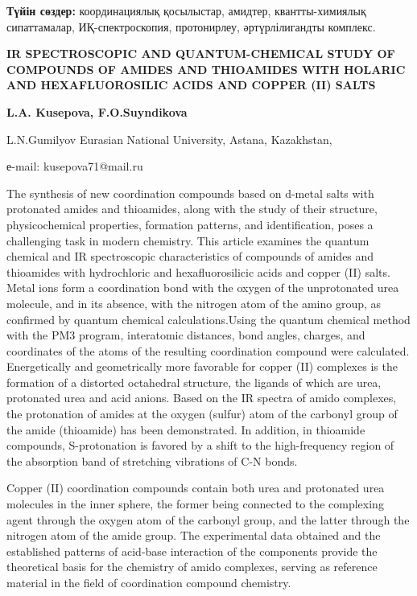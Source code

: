 {\bfseries Түйін сөздер:} координациялық қосылыстар, амидтер,
квантты-химиялық сипаттамалар, ИҚ-спектроскопия, протонирлеу,
әртүрлілигандты комплекс.

\begin{center}
{\large\bfseries IR SPECTROSCOPIC AND QUANTUM-CHEMICAL STUDY OF COMPOUNDS OF AMIDES AND THIOAMIDES WITH HOLARIC AND HEXAFLUOROSILIC ACIDS AND COPPER (II) SALTS}

{\bfseries L.A. Kusepova\envelope, F.O.Suyndikova}

L.N.Gumilyov Eurasian National University, Astana, Kazakhstan,

е-mail: kusepova71@mail.ru
\end{center}

The synthesis of new coordination compounds based on d-metal salts with
protonated amides and thioamides, along with the study of their
structure, physicochemical properties, formation patterns, and
identification, poses a challenging task in modern chemistry. This
article examines the quantum chemical and IR spectroscopic
characteristics of compounds of amides and thioamides with hydrochloric
and hexafluorosilicic acids and copper (II) salts. Metal ions form a
coordination bond with the oxygen of the unprotonated urea molecule, and
in its absence, with the nitrogen atom of the amino group, as confirmed
by quantum chemical calculations.Using the quantum chemical method with
the PM3 program, interatomic distances, bond angles, charges, and
coordinates of the atoms of the resulting coordination compound were
calculated. Energetically and geometrically more favorable for copper
(II) complexes is the formation of a distorted octahedral structure, the
ligands of which are urea, protonated urea and acid anions. Based on the
IR spectra of amido complexes, the protonation of amides at the oxygen
(sulfur) atom of the carbonyl group of the amide (thioamide) has been
demonstrated. In addition, in thioamide compounds, S-protonation is
favored by a shift to the high-frequency region of the absorption band
of stretching vibrations of C-N bonds.

Copper (II) coordination compounds contain both urea and protonated urea
molecules in the inner sphere, the former being connected to the
complexing agent through the oxygen atom of the carbonyl group, and the
latter through the nitrogen atom of the amide group. The experimental
data obtained and the established patterns of acid-base interaction of
the components provide the theoretical basis for the chemistry of amido
complexes, serving as reference material in the field of coordination
compound chemistry.

